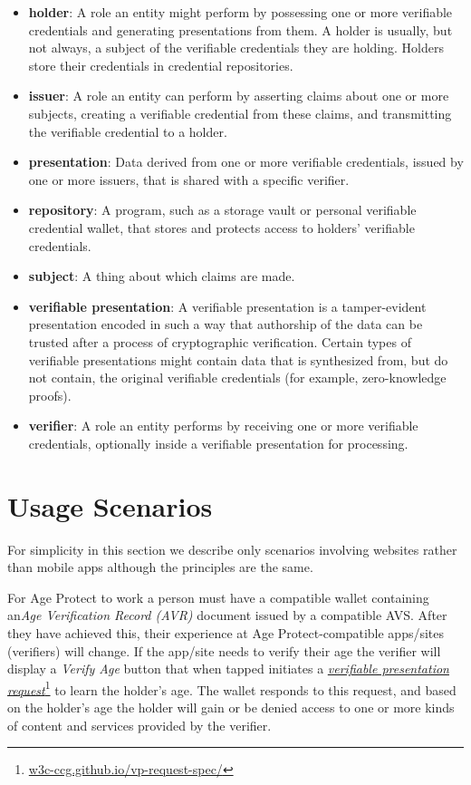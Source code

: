 \documentclass[11pt, oneside]{article}   	%
\newcommand{\hyperfootnote}[1][]{\def\ArgI{{#1}}\hyperfootnoteRelay}
\newcommand\hyperfootnoteRelay[2][]{\href{#1#2}{\ArgI}\footnote{\href{#1#2}{#2}}}
\begin{document}
\begin{itemize}
	\item \textbf{holder}: A role an entity might perform by possessing one or more verifiable credentials and generating presentations from them. A holder is usually, but not always, a subject of the verifiable credentials they are holding. Holders store their credentials in credential repositories.
	\item \textbf{issuer}: A role an entity can perform by asserting claims about one or more subjects, creating a verifiable credential from these claims, and transmitting the verifiable credential to a holder.
	\item \textbf{presentation}: Data derived from one or more verifiable credentials, issued by one or more issuers, that is shared with a specific verifier.
	\item \textbf{repository}: A program, such as a storage vault or personal verifiable credential wallet, that stores and protects access to holders' verifiable credentials.
	\item \textbf{subject}: A thing about which claims are made. 
	\item \textbf{verifiable presentation}: A verifiable presentation is a tamper-evident presentation encoded in such a way that authorship of the data can be trusted after a process of cryptographic verification. Certain types of verifiable presentations might contain data that is synthesized from, but do not contain, the original verifiable credentials (for example, zero-knowledge proofs).
	\item \textbf{verifier}: A role an entity performs by receiving one or more verifiable credentials, optionally inside a verifiable presentation for processing. 
\end{itemize}	

\section{Usage Scenarios} 

For simplicity in this section we describe only scenarios involving websites rather than mobile apps although the principles are the same.

For Age Protect to work a person must have a compatible wallet containing an\emph{Age Verification Record (AVR)} document issued by a compatible AVS. After they have achieved this, their experience at Age Protect-compatible apps/sites (verifiers) will change. If the app/site needs to verify their age the verifier will display a \emph{Verify Age} button that when tapped initiates a \hyperfootnote[\emph{verifiable presentation request}][https://]{w3c-ccg.github.io/vp-request-spec/} to learn the holder's age. The wallet responds to this request, and based on the holder's age the holder will gain or be denied access to one or more kinds of content and services provided by the verifier. 
\end{document}
